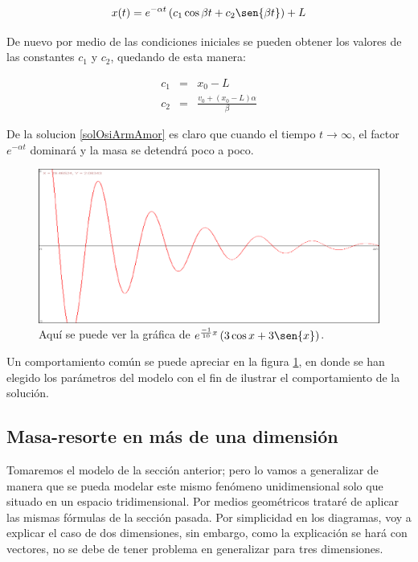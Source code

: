 \begin{equation}
\label{solOsiArmAmor} 
x(t) = e^{-\alpha t} \left( c_1 \cos{\beta t} + c_2 \sen{\beta t} \right) + L
\end{equation}

De nuevo por medio de las condiciones iniciales se pueden obtener los valores de las constantes $c_1$ y $c_2$, quedando de esta manera:

\begin{eqnarray}
c_1 & = & x_0 - L \nonumber \\
c_2 & = & \frac{v_0 + \left( x_0 - L \right) \alpha }{\beta } \nonumber 
\end{eqnarray}

De la solucion \ref{solOsiArmAmor} es claro que cuando el tiempo $t \rightarrow \infty $, el factor $e^{-\alpha t}$ dominará y la masa se detendrá poco a poco.

\begin{figure}
 \centering
 \includegraphics[]{Img/oscilador_amortiguado}
 \caption[Plano fase del oscilador armónico amortiguado]{ 
 Aquí se puede ver la gráfica de $e^{\frac{-1}{10}x} \left( 3 \cos{x} + 3 \sen{x} \right)$.
 } \label{OsciAmor:fig}
\end{figure}


Un comportamiento común se puede apreciar en la figura \ref{OsciAmor:fig}, en donde se han elegido los parámetros del modelo con el fin de ilustrar el comportamiento de la solución.

\subsection{Masa-resorte en más de una dimensión}

Tomaremos el modelo de la sección anterior; pero lo vamos a generalizar de manera que se pueda modelar este mismo fenómeno unidimensional solo que situado en un espacio tridimensional. Por medios geométricos trataré de aplicar las mismas fórmulas de la sección pasada. Por simplicidad en los diagramas, voy a explicar el caso de dos dimensiones, sin embargo, como la explicación se hará con vectores, no se debe de tener problema en generalizar para tres dimensiones.

